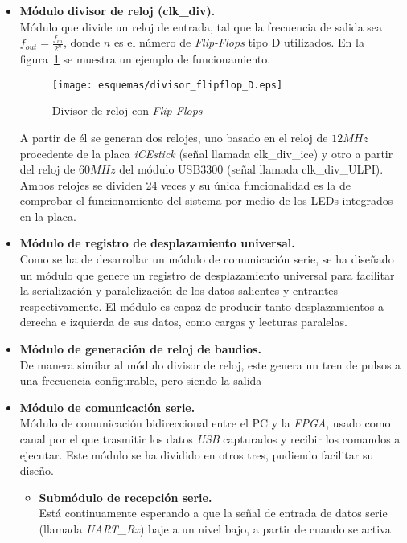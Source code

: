 \begin{itemize}
    \item \textbf{Módulo divisor de reloj (clk\_div).} \\
    Módulo que divide un reloj de entrada, tal que la frecuencia de salida sea $f_{out} = \frac{f_{in}}{2^n}$, donde $n$ es el número de \emph{Flip-Flops} tipo D utilizados. En la figura~\ref{fig:clk_div_esquema} se muestra un ejemplo de funcionamiento.
    
    \begin{figure}[hbt]
        \centering
        \texttt{[image: esquemas/divisor\_flipflop\_D.eps]}
        \caption{Divisor de reloj con \emph{Flip-Flops}}
        \label{fig:clk_div_esquema}
    \end{figure}

    A partir de él se generan dos relojes, uno basado en el reloj de $12MHz$ procedente de la placa \emph{iCEstick} (señal llamada clk\_div\_ice) y otro a partir del reloj de $60MHz$ del módulo USB3300 (señal  llamada clk\_div\_ULPI). Ambos relojes se dividen 24 veces y su única funcionalidad es la de  comprobar el funcionamiento del sistema por medio de los LEDs integrados en la placa.

    \item \textbf{Módulo de registro de desplazamiento universal.} \\
    Como se ha de desarrollar un módulo de comunicación serie, se ha diseñado un módulo que genere un registro de desplazamiento universal para facilitar la serialización y paralelización de los datos salientes y entrantes respectivamente. El módulo es capaz de producir tanto desplazamientos a derecha e izquierda de sus datos, como cargas y lecturas paralelas.


    \item \textbf{Módulo de generación de reloj de baudios.} \\
    De manera similar al módulo divisor de reloj, este genera un tren de pulsos a una frecuencia configurable, pero siendo la salida 

    \item \textbf{Módulo de comunicación serie.} \\
    Módulo de comunicación bidireccional entre el PC y la \emph{FPGA}, usado como canal por el que trasmitir los datos \emph{USB} capturados y recibir los comandos a ejecutar. Este módulo se ha dividido en otros tres, pudiendo facilitar su diseño.
    \begin{itemize}
        \item \textbf{Submódulo de recepción serie.} \\
        Está continuamente esperando a que la señal de entrada de datos serie (llamada \emph{UART\_Rx}) baje a un nivel bajo, a partir de cuando se activa


\end{itemize}
\end{itemize}
